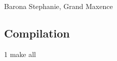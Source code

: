 Barona Stephanie, Grand Maxence

\subsection*{Compilation}


\begin{DoxyCode}
1 make all
\end{DoxyCode}
 